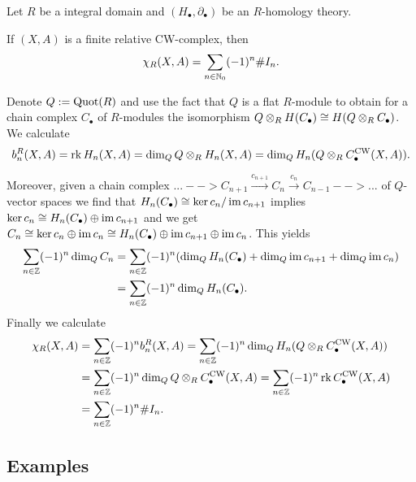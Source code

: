 	\begin{proposition}
		Let $R$ be a integral domain and $(H_\bullet, \partial_\bullet)$ be an $R$-homology theory.

		If $(X,A)$ is a finite relative CW-complex, then
		\begin{equation*}
			\chi_R(X,A) = \sum \limits_{n \in \mathbb{N}_0}(-1)^n \#I_n.
		\end{equation*}
	\end{proposition}
	\begin{sketch}
		Denote $Q := \operatorname{Quot}(R)$ and use the fact that $Q$ is a flat $R$-module to obtain for a chain complex $C_\bullet$ of $R$-modules the isomorphism $Q \otimes_R H(C_\bullet) \cong H(Q \otimes_R C_\bullet)$. We calculate
		\begin{equation*}
			b_n^R(X,A) = \operatorname{rk} H_n(X,A) = \dim_Q Q \otimes_R H_n(X,A) = \dim_Q H_n(Q \otimes_R C_\bullet^\text{CW}(X,A)).
		\end{equation*}

		Moreover, given a chain complex $...--> C_{n+1} \xrightarrow{c_{n+1}} C_n \xrightarrow{c_n} C_{n-1}-->...$ of $Q$-vector spaces we find that $H_n(C_\bullet) \cong \ker c_n / \operatorname{im} c_{n+1}$ implies $\ker c_n \cong H_n(C_\bullet) \oplus \operatorname{im} c_{n+1}$ and we get $C_n \cong \ker c_n \oplus \operatorname{im} c_n \cong H_n(C_\bullet) \oplus \operatorname{im} c_{n+1} \oplus \operatorname{im} c_n$. This yields
		\begin{align*}
			\sum \limits_{n \in \mathbb{Z}} (-1)^n \dim_Q C_n &= \sum \limits_{n \in \mathbb{Z}} (-1)^n (\dim_Q H_n(C_\bullet) + \dim_Q \operatorname{im} c_{n+1} + \dim_Q \operatorname{im} c_n)\\
			&= \sum \limits_{n \in \mathbb{Z}} (-1)^n \dim_Q H_n(C_\bullet).
		\end{align*}
		Finally we calculate
		\begin{align*}
			\chi_R(X,A) &= \sum \limits_{n \in \mathbb{Z}}(-1)^n b_n^R(X,A) = \sum \limits_{n \in \mathbb{Z}} (-1)^n \dim_Q H_n(Q \otimes_R C_\bullet^\text{CW}(X,A))\\
			&= \sum \limits_{n \in \mathbb{Z}} (-1)^n \dim_Q Q \otimes_R C_\bullet^\text{CW}(X,A) = \sum \limits_{n \in \mathbb{Z}} (-1)^n \operatorname{rk} C_\bullet^\text{CW}(X,A)\\
			&= \sum \limits_{n \in \mathbb{Z}} (-1)^n \# I_n.
		\end{align*}
	\end{sketch}

	\newpage
	\subsection{Examples}

